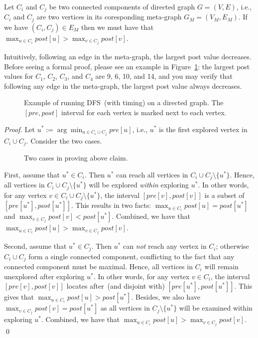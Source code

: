 \begin{claim}
Let $C_i$ and $C_j$ be two connected components of directed graph $G = (V, E)$, i.e., $C_i$ and $C_j$ are two
vertices in its coresponding meta-graph $G_M = (V_M, E_M)$. If we have $(C_i, C_j) \in E_M$ then
we must have that $\max_{u\in C_i} post[u] > \max_{v\in C_j} post[v]$.
\end{claim}

Intuitively, following an edge in the meta-graph, the largest post value decreases.
Before seeing a formal proof, please see an example in Figure~\ref{fig:dfs}:
the largest post values for $C_1$, $C_2$, $C_3$, and $C_4$ are 9, 6, 10, and 14,
and you may verify that following any edge in the meta-graph, the largest post value always decreases.

\begin{figure}[!h]
\centering{}
\caption{Example of running DFS~(with timing) on a directed graph. The $[pre,post]$ interval for each vertex
is marked next to each vertex. }
\label{fig:dfs}
\end{figure}


\emph{Proof.} Let $u^* := \arg\min_{u\in C_i\cup C_j} pre[u]$, i.e., $u^*$ is the first explored vertex in $C_i\cup C_j$.
Consider the two cases. 

\begin{figure}[h!]
\centering{}
\caption{Two cases in proving above claim.}
\label{fig:meta}
\end{figure}

First, assume that $u^* \in C_i$. Then $u^*$ can reach all vertices in $C_i\cup C_j\setminus \{u^*\}$.
Hence, all vertices in $C_i\cup C_j\setminus \{u^*\}$ will be explored \emph{within} exploring $u^*$.
In other words, for any vertex $v\in C_i\cup C_j\setminus \{u^*\}$, the interval $[pre[v], post[v]]$
is a subset of $[pre[u^*], post[u^*]]$. This results in two facts:
$\max_{u\in C_i} post[u] = post[u^*]$ and $\max_{v\in C_j} post[v] < post[u^*]$.
Combined, we have that $\max_{u\in C_i} post[u] > \max_{v\in C_j} post[v]$.

Second, assume that $u^* \in C_j$. Then $u^*$ can \emph{not} reach any vertex in $C_i$; otherwise
$C_i\cup C_j$ form a single connected component, conflicting to the fact that any connected component must be maximal.
Hence, all vertices in $C_i$ will remain unexplored after exploring $u^*$.
In other words, for any vertex $v\in C_i$, the interval $[pre[v], post[v]]$
locates after~(and disjoint with) $[pre[u^*], post[u^*]]$. This gives that
$\max_{u\in C_i} post[u] > post[u^*]$. Besides, 
we also have $\max_{v\in C_j} post[v] = post[u^*]$ as all vertices in $C_j\setminus \{u^*\}$ will be examined within exploring $u^*$.
Combined, we have that $\max_{u\in C_i} post[u] > \max_{v\in C_j} post[v]$.
\qed


